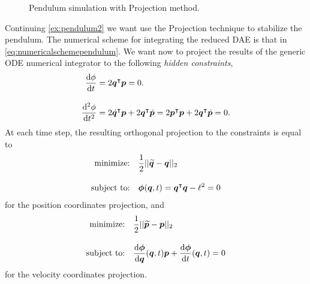 \begin{example}
	\begin{figure}[htbp]
		\centering
		\caption{Pendulum simulation with Projection method.}
		\label{}
	\end{figure}
	Continuing \cref{ex:pendulum2} we want use the 
	Projection technique to stabilize the pendulum.
	The numerical scheme for integrating the reduced DAE
	is that in \cref{eq:numericalschemependulum}.
	We want now to project the results of the generic ODE
	numerical integrator to the following \emph{hidden constraints},
	\begin{equation*}
		\begin{split}
		\dfrac{\mathop{}\!\mathrm{d}\phi}{\mathop{}\!\mathrm{d} t} &= 2\bm{q}^{\intercal}\bm{p} = 0.\\[1em]
		\dfrac{\mathop{}\!\mathrm{d}^{2}\phi}{\mathop{}\!\mathrm{d} t^2} & = 2\dot{\bm{q}}^{\intercal}\bm{p} 
		+ 2\bm{q}^{\intercal}\dot{\bm{p}} = 2\bm{p}^{\intercal}\bm{p} 
		+ 2\bm{q}^{\intercal}\dot{\bm{p}} = 0.
		\end{split}
	\end{equation*}
	At each time step, the resulting orthogonal projection to the constraints is equal to
	\begin{equation}
		\begin{split}
		\text{minimize:} \quad & \dfrac{1}{2}|| \widetilde{\bm{q}} - \bm{q} ||_2
		\\[1em]
		\text{subject to:} \quad & \bm{\phi}(\bm{q},t) = \bm{q}^{\intercal}\bm{q} - \ell^{2} = 0
		\end{split}
	\end{equation}
	for the position coordinates projection, and
	\begin{equation}
		\begin{split}
		\textrm{minimize:} \quad &
		\dfrac{1}{2}|| \widetilde{\bm{p}} - \bm{p} ||_2\\[1em]
		\text{subject to:} \quad & \frac{\mathop{}\!\mathrm{d}\bm{\phi}}{\mathrm{d}\bm{q}}(\bm{q},t)\bm{p}
		+ \frac{\mathop{}\!\mathrm{d}\bm{\phi}}{\mathrm{d}t}(\bm{q},t)= 0
		\end{split}
	\end{equation}
	for the velocity coordinates projection.
\end{example}

\endinput
